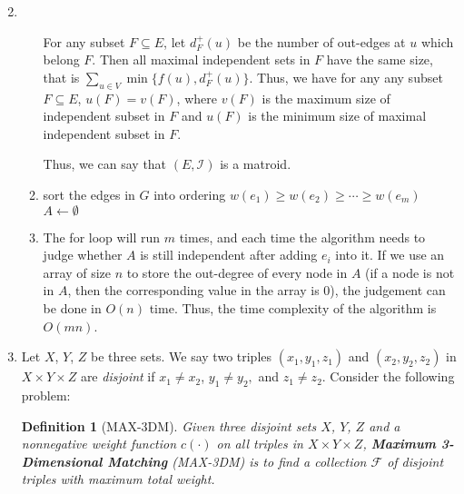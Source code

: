 \documentclass[12pt,a4paper]{article}
\makeatletter
\newtheorem*{solution}{Solution}
\newtheorem{definition}{Definition}
\theoremstyle{definition}
\renewenvironment{solution}[1][Solution] {\par\pushQED{\qed}\normalfont\topsep6\p@\@plus6\p@\relax\trivlist\item[\hskip\labelsep\bfseries#1\@addpunct{.}]\ignorespaces}{\popQED\endtrivlist\@endpefalse} \makeatother
\makeatother
\begin{document}
\begin{enumerate}
\begin{solution}
\begin{enumerate}
				For any subset $F \subseteq E$, let $d^{+}_{F}(u)$ be the number of out-edges at $u$ which belong $F$. Then all maximal independent sets in $F$ have the same size, that is $\sum_{u \in V}\min\{ f(u),d^{+}_{F}(u)\}$. Thus, we have for any any subset $F \subseteq E$, $u(F) = v(F)$, where $v(F)$ is the maximum size of independent subset in $F$ and $u(F)$ is the minimum size of maximal independent subset in $F$. 
				
				Thus, we can say that $(E,\mathcal{I})$ is a matroid.
				\item {\noindent
					\begin{minipage}[t]{0.9\textwidth}
						\centering
						\begin{algorithm}[H]
							\BlankLine
							\caption{$greedy1$} \label{Alg-gre1}
							sort the edges in $G$ into ordering $w(e_1) \geq w(e_2) \geq \cdots \geq w(e_m)$\;
							$A \leftarrow \emptyset$\;
							\;
						\end{algorithm}
					\end{minipage}
				}
				
				\item The for loop will run $m$ times, and each time the algorithm needs to judge whether $A$ is still independent after adding $e_i$ into it. If we use an array of size $n$ to store the out-degree of every node in $A$ (if a node is not in $A$, then the corresponding value in the array is $0$), the judgement can be done in $O(n)$ time. Thus, the time complexity of the algorithm is $O(mn)$.
			\end{enumerate}
		\end{solution}
		
		\item Let $X$, $Y$, $Z$ be three sets. We say two triples $\left(x_{1}, y_{1}, z_{1}\right)$ and $\left(x_{2}, y_{2}, z_{2}\right)$ in $X \times Y \times Z$ are \textit{disjoint} if $x_{1} \neq x_{2}$, $y_{1} \neq y_{2},$ and $z_{1} \neq z_{2}$. Consider the following problem:
		
		\begin{definition}[MAX-3DM] 
			Given three disjoint sets $X$, $Y$, $Z$ and a nonnegative weight function $c(\cdot)$ on all triples in $X \times Y \times Z$, \textbf{Maximum 3-Dimensional Matching} (MAX-3DM) is to find a collection $\mathcal{F}$ of disjoint triples with maximum total weight.
		\end{definition}
		

\end{enumerate}
\end{document}
